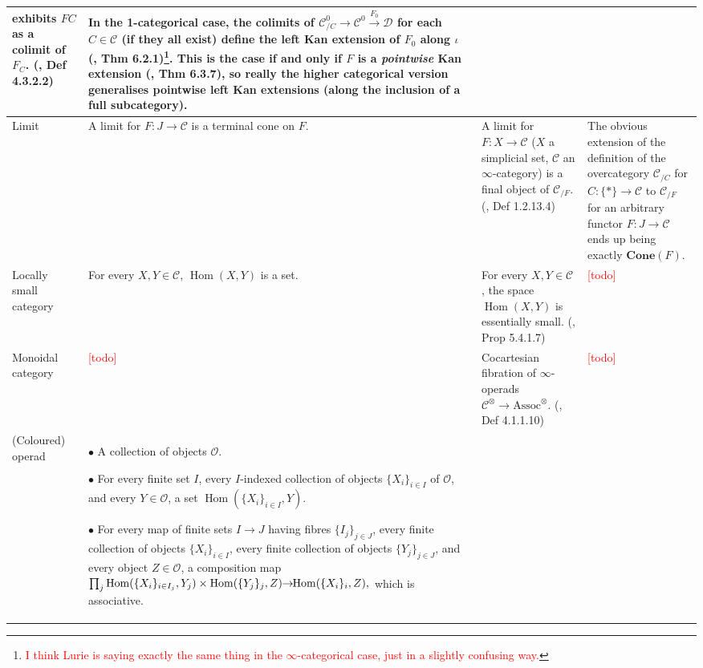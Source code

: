 \documentclass{article}
\DeclareMathOperator{\Hom}{Hom}
\def\textcolour{\textcolor}
\begin{document}
\begin{centre}
\begin{longtable}{ |p{3.2cm}||p{5cm}|p{5.2cm}|p{5cm}|  }
\begin{tikzcd}
\end{tikzcd}\) exhibits \(FC\) as a colimit of \(F_C\). (\autocite{htt}, Def 4.3.2.2) & In the 1-categorical case, the colimits of \(\mathcal{C}^0_{/C}\to \mathcal{C}^0 \xrightarrow{F_0} \mathcal{D}\) for each \(C \in \mathcal{C}\) (if they all exist) define the left Kan extension of \(F_0\) along \(\iota\) (\autocite{context}, Thm 6.2.1)\footnote{\textcolour{red}{I think Lurie is saying exactly the same thing in the \(\infty\)-categorical case, just in a slightly confusing way.}}. This is the case if and only if \(F\) is a \textit{pointwise} Kan extension (\autocite{context}, Thm 6.3.7), so really the higher categorical version generalises pointwise left Kan extensions (along the inclusion of a full subcategory).\\
\hline
Limit & A limit for \(F : J \to \mathcal{C}\) is a terminal cone on \(F\). & A limit for \(F : X\to \mathcal{C} \) (\(X\) a simplicial set, \(\mathcal{C}\) an \(\infty\)-category) is a final object of \(\mathcal{C}_{/F}\). (\autocite{htt}, Def 1.2.13.4) & The obvious extension of the definition of the overcategory \(\mathcal{C}_{/C}\) for \(C : \{*\} \to \mathcal{C}\) to \(\mathcal{C}_{/F}\)  for an arbitrary functor \(F : J \to \mathcal{C}\) ends up being exactly \(\textbf{Cone}(F)\).\\
\hline
Locally small category & For every \(X, Y \in \mathcal{C}\), \(\Hom(X, Y)\) is a set. & For every \(X, Y \in \mathcal{C}\), the space \(\Hom(X,Y)\) is essentially small. (\autocite{htt}, Prop 5.4.1.7) & \textcolour{red}{[todo]} \\
\hline
Monoidal category & \textcolour{red}{[todo]} & Cocartesian fibration of \(\infty\)-operads \(\mathcal{C}^\otimes \to \text{Assoc}^\otimes\). (\autocite{ha}, Def 4.1.1.10) & \textcolour{red}{[todo]}\\
\hline
(Coloured) operad & 
\(\bullet\) A collection of objects \(\mathcal{O}\).

\(\bullet\) For every finite set \(I\), every \(I\)-indexed collection of objects \(\{X_i\}_{i\in I}\) of \(\mathcal{O}\), and every \(Y \in \mathcal{O}\), a set \(\Hom(\{X_i\}_{i\in I}, Y)\).

\(\bullet\) For every map of finite sets \(I\to J\) having fibres \(\{I_j\}_{j\in J}\), every finite collection of objects \(\{X_i\}_{i\in I}\), every finite collection of objects \(\{Y_j\}_{j\in J}\), and every object \(Z \in \mathcal{O}\), a composition map 
\(\prod_j\Hom(\{X_i\}_{i\in I_j}, Y_j)\times \Hom(\{Y_j\}_j, Z)\hspace{-0.7ex}\to\hspace{-0.8ex}\Hom(\{X_i\}_i, Z),\) which is associative.


\end{longtable}
\end{centre}
\end{document}
